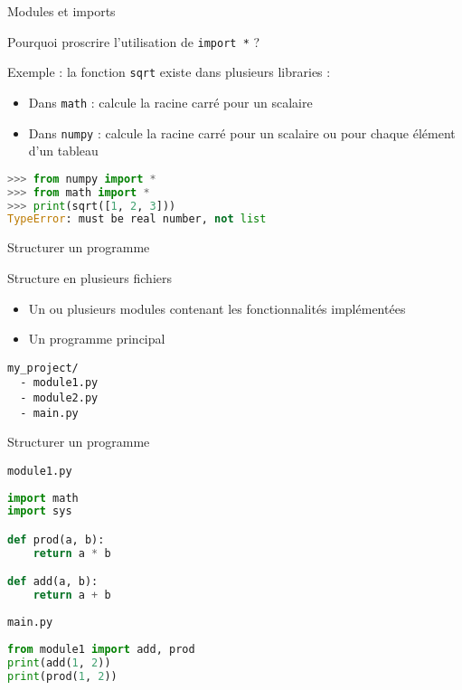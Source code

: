 \begin{frame}[fragile]{Modules et imports}

  \begin{block}{Pourquoi proscrire l'utilisation de \texttt{import *} ?}
  \medskip

  Exemple : la fonction \texttt{sqrt} existe dans plusieurs libraries :
  \begin{itemize}
      \item Dans \texttt{math} : calcule la racine carré pour un scalaire
      \item Dans \texttt{numpy} : calcule la racine carré pour un scalaire ou pour chaque élément d'un tableau
  \end{itemize}

\begin{lstlisting}[language=Python, morekeywords={TypeError}, numbers=none]
>>> from numpy import *
>>> from math import *
>>> print(sqrt([1, 2, 3]))
TypeError: must be real number, not list
\end{lstlisting}
  
  \end{block}
\end{frame}

\begin{frame}[fragile]{Structurer un programme}

  \begin{block}{Structure en plusieurs fichiers}
    \begin{itemize}
      \item Un ou plusieurs modules contenant les fonctionnalités implémentées
      \item Un programme principal
    \end{itemize}
  \end{block}

\bigskip

\begin{lstlisting}[numbers=none]
my_project/
  - module1.py
  - module2.py
  - main.py
\end{lstlisting}
\end{frame}



\begin{frame}[fragile]{Structurer un programme}

  \texttt{module1.py}
\begin{lstlisting}[language=python, numbers=none]
import math
import sys

def prod(a, b):
    return a * b

def add(a, b):
    return a + b
\end{lstlisting} 

\texttt{main.py}

\begin{lstlisting}[language=python, numbers=none]
from module1 import add, prod
print(add(1, 2))
print(prod(1, 2))
\end{lstlisting} 
  

\end{frame}
